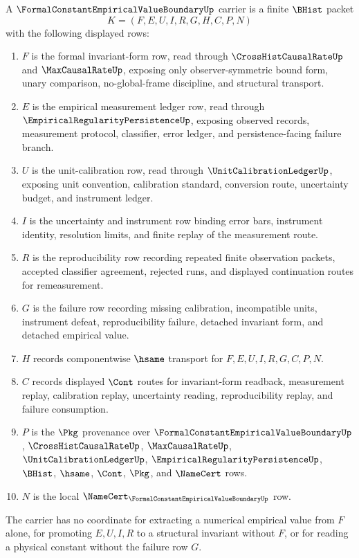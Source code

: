 \begin{definition}
\label{def:formal-constant-empirical-value-boundary-carrier}
A $\FormalConstantEmpiricalValueBoundaryUp$ carrier is a finite $\BHist$ packet
$$
K=(F,E,U,I,R,G,H,C,P,N)
$$
with the following displayed rows:
\begin{enumerate}
\item $F$ is the formal invariant-form row, read through $\CrossHistCausalRateUp$ and $\MaxCausalRateUp$, exposing only observer-symmetric bound form, unary comparison, no-global-frame discipline, and structural transport.
\item $E$ is the empirical measurement ledger row, read through $\EmpiricalRegularityPersistenceUp$, exposing observed records, measurement protocol, classifier, error ledger, and persistence-facing failure branch.
\item $U$ is the unit-calibration row, read through $\UnitCalibrationLedgerUp$, exposing unit convention, calibration standard, conversion route, uncertainty budget, and instrument ledger.
\item $I$ is the uncertainty and instrument row binding error bars, instrument identity, resolution limits, and finite replay of the measurement route.
\item $R$ is the reproducibility row recording repeated finite observation packets, accepted classifier agreement, rejected runs, and displayed continuation routes for remeasurement.
\item $G$ is the failure row recording missing calibration, incompatible units, instrument defeat, reproducibility failure, detached invariant form, and detached empirical value.
\item $H$ records componentwise $\hsame$ transport for $F,E,U,I,R,G,C,P,N$.
\item $C$ records displayed $\Cont$ routes for invariant-form readback, measurement replay, calibration replay, uncertainty reading, reproducibility replay, and failure consumption.
\item $P$ is the $\Pkg$ provenance over $\FormalConstantEmpiricalValueBoundaryUp$, $\CrossHistCausalRateUp$, $\MaxCausalRateUp$, $\UnitCalibrationLedgerUp$, $\EmpiricalRegularityPersistenceUp$, $\BHist$, $\hsame$, $\Cont$, $\Pkg$, and $\NameCert$ rows.
\item $N$ is the local $\NameCert_{\FormalConstantEmpiricalValueBoundaryUp}$ row.
\end{enumerate}
The carrier has no coordinate for extracting a numerical empirical value from $F$ alone, for promoting $E,U,I,R$ to a structural invariant without $F$, or for reading a physical constant without the failure row $G$.
\end{definition}

